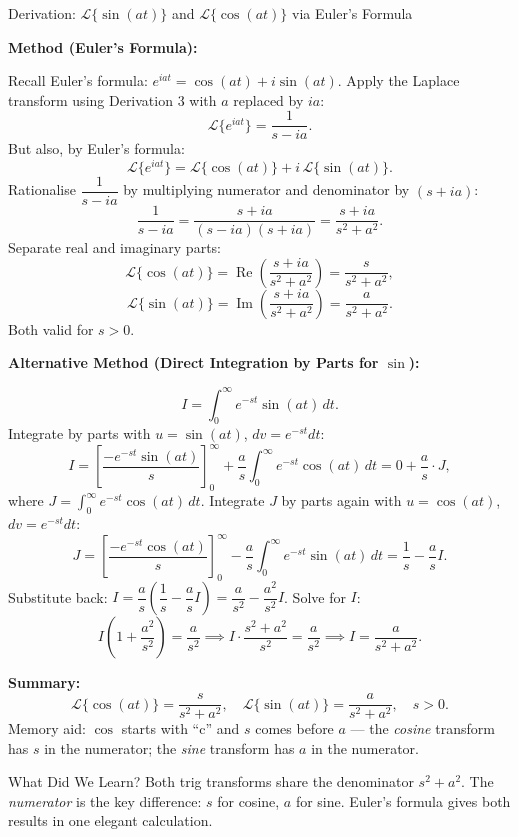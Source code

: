 \documentclass[12pt,a4paper]{article}
\begin{document}
\begin{infobox}{Derivation: $\mathcal{L}\{\sin(at)\}$ and $\mathcal{L}\{\cos(at)\}$ via Euler's Formula}

\textbf{Method (Euler's Formula):}

Recall Euler's formula: $e^{iat} = \cos(at) + i\sin(at)$.
Apply the Laplace transform using Derivation 3 with $a$ replaced by $ia$:
\[
  \mathcal{L}\{e^{iat}\} = \frac{1}{s - ia}.
\]
But also, by Euler's formula:
\[
  \mathcal{L}\{e^{iat}\} = \mathcal{L}\{\cos(at)\} + i\,\mathcal{L}\{\sin(at)\}.
\]
Rationalise $\dfrac{1}{s - ia}$ by multiplying numerator and denominator by $(s + ia)$:
\[
  \frac{1}{s - ia} = \frac{s + ia}{(s - ia)(s + ia)} = \frac{s + ia}{s^2 + a^2}.
\]
Separate real and imaginary parts:
\[
  \mathcal{L}\{\cos(at)\} = \operatorname{Re}\left(\frac{s+ia}{s^2+a^2}\right) = \frac{s}{s^2+a^2},
\]
\[
  \mathcal{L}\{\sin(at)\} = \operatorname{Im}\left(\frac{s+ia}{s^2+a^2}\right) = \frac{a}{s^2+a^2}.
\]
Both valid for $s > 0$.

\textbf{Alternative Method (Direct Integration by Parts for $\sin$):}

\[
  I = \int_0^\infty e^{-st}\sin(at)\,dt.
\]
Integrate by parts with $u = \sin(at)$, $dv = e^{-st}dt$:
\[
  I = \left[\frac{-e^{-st}\sin(at)}{s}\right]_0^\infty + \frac{a}{s}\int_0^\infty e^{-st}\cos(at)\,dt
  = 0 + \frac{a}{s} \cdot J,
\]
where $J = \int_0^\infty e^{-st}\cos(at)\,dt$. Integrate $J$ by parts again
with $u = \cos(at)$, $dv = e^{-st}dt$:
\[
  J = \left[\frac{-e^{-st}\cos(at)}{s}\right]_0^\infty - \frac{a}{s}\int_0^\infty e^{-st}\sin(at)\,dt
  = \frac{1}{s} - \frac{a}{s}I.
\]
Substitute back: $I = \dfrac{a}{s}\left(\dfrac{1}{s} - \dfrac{a}{s}I\right) = \dfrac{a}{s^2} - \dfrac{a^2}{s^2}I$.
Solve for $I$:
\[
  I\left(1 + \frac{a^2}{s^2}\right) = \frac{a}{s^2}
  \implies I\cdot\frac{s^2+a^2}{s^2} = \frac{a}{s^2}
  \implies I = \frac{a}{s^2+a^2}.
\]

\textbf{Summary:}
\[
  \mathcal{L}\{\cos(at)\} = \frac{s}{s^2+a^2}, \quad
  \mathcal{L}\{\sin(at)\} = \frac{a}{s^2+a^2}, \quad s > 0.
\]
Memory aid: $\cos$ starts with ``c'' and $s$ comes before $a$ --- the \emph{cosine} transform
has $s$ in the numerator; the \emph{sine} transform has $a$ in the numerator.
\end{infobox}

\begin{learnbox}{What Did We Learn?}
Both trig transforms share the denominator $s^2 + a^2$. The \emph{numerator} is the key
difference: $s$ for cosine, $a$ for sine. Euler's formula gives both results in one elegant
calculation.
\end{learnbox}
\end{document}
